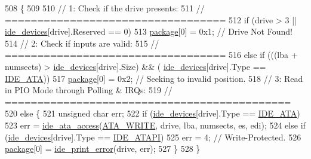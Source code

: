 \begin{DoxyCode}
508                                                             \{
509  
510    \textcolor{comment}{// 1: Check if the drive presents:}
511    \textcolor{comment}{// ==================================}
512    \textcolor{keywordflow}{if} (drive > 3 || \hyperlink{a00026_ab97a828ed4839b575dc382e2bf826e87_ab97a828ed4839b575dc382e2bf826e87}{ide\_devices}[drive].Reserved == 0)
513       \hyperlink{a00026_a820b2230ab700e13350794494bd4a60f_a820b2230ab700e13350794494bd4a60f}{package}[0] = 0x1;      \textcolor{comment}{// Drive Not Found!}
514    \textcolor{comment}{// 2: Check if inputs are valid:}
515    \textcolor{comment}{// ==================================}
516    \textcolor{keywordflow}{else} \textcolor{keywordflow}{if} (((lba + numsects) > \hyperlink{a00026_ab97a828ed4839b575dc382e2bf826e87_ab97a828ed4839b575dc382e2bf826e87}{ide\_devices}[drive].Size) && (
      \hyperlink{a00026_ab97a828ed4839b575dc382e2bf826e87_ab97a828ed4839b575dc382e2bf826e87}{ide\_devices}[drive].Type == \hyperlink{a00023_a3046279f2a25227c121b69f4cf855bf8_a3046279f2a25227c121b69f4cf855bf8}{IDE\_ATA}))
517       \hyperlink{a00026_a820b2230ab700e13350794494bd4a60f_a820b2230ab700e13350794494bd4a60f}{package}[0] = 0x2;                     \textcolor{comment}{// Seeking to invalid position.}
518    \textcolor{comment}{// 3: Read in PIO Mode through Polling & IRQs:}
519    \textcolor{comment}{// ============================================}
520    \textcolor{keywordflow}{else} \{
521       \textcolor{keywordtype}{unsigned} \textcolor{keywordtype}{char} err;
522       \textcolor{keywordflow}{if} (\hyperlink{a00026_ab97a828ed4839b575dc382e2bf826e87_ab97a828ed4839b575dc382e2bf826e87}{ide\_devices}[drive].Type == \hyperlink{a00023_a3046279f2a25227c121b69f4cf855bf8_a3046279f2a25227c121b69f4cf855bf8}{IDE\_ATA})
523          err = \hyperlink{a00023_a4da0883393a98b937fdc3015a0a3f265_a4da0883393a98b937fdc3015a0a3f265}{ide\_ata\_access}(\hyperlink{a00023_a9a19b84aa7a02ac7e07528795816ffb2_a9a19b84aa7a02ac7e07528795816ffb2}{ATA\_WRITE}, drive, lba, numsects, es, edi);
524       \textcolor{keywordflow}{else} \textcolor{keywordflow}{if} (\hyperlink{a00026_ab97a828ed4839b575dc382e2bf826e87_ab97a828ed4839b575dc382e2bf826e87}{ide\_devices}[drive].Type == \hyperlink{a00023_a6513ee2a4da2c6aaa691b9d4c639a53e_a6513ee2a4da2c6aaa691b9d4c639a53e}{IDE\_ATAPI})
525          err = 4; \textcolor{comment}{// Write-Protected.}
526       \hyperlink{a00026_a820b2230ab700e13350794494bd4a60f_a820b2230ab700e13350794494bd4a60f}{package}[0] = \hyperlink{a00023_af7757307613c29c9bcbf0f8f5b2feee5_af7757307613c29c9bcbf0f8f5b2feee5}{ide\_print\_error}(drive, err);
527    \}
528 \}
\end{DoxyCode}


